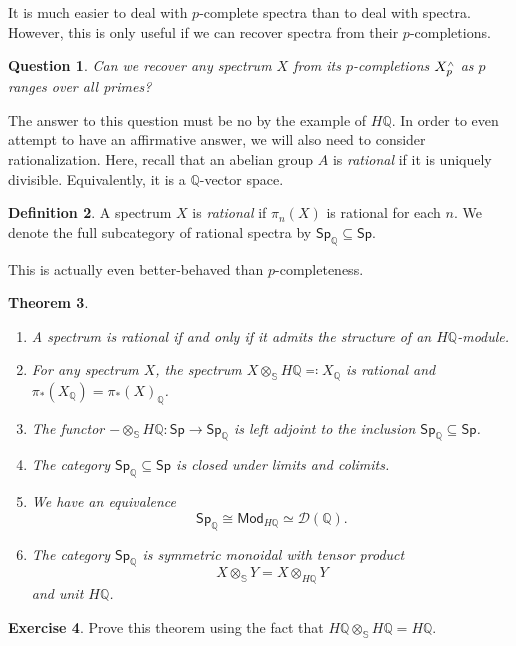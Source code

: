 \documentclass[10pt, oneside]{memoir}
\newtheorem{thm}{Theorem}[subsection]
\newtheorem{quest}[thm]{Question}
\theoremstyle{definition}
\newtheorem{defn}[thm]{Definition}
\newtheorem{exer}[thm]{Exercise}
\theoremstyle{remark}
\theoremstyle{plain}
\theoremstyle{definition}
\theoremstyle{remark}
\newcommand{\Q}{\mathbb{Q}}
\newcommand{\bS}{\mathbb{S}}
\newcommand{\mc}[1]{\mathcal{#1}}
\newcommand{\ms}[1]{\mathsf{#1}}
\newcommand{\1}{\mathbf{1}}
\newcommand{\2}{\mathbf{2}}
\newcommand{\3}{\mathbf{3}}
\newcommand{\sw}{\mathsmaller{\wedge}}
\begin{document}
It is much easier to deal with $p$-complete spectra than to deal with spectra. However, this is only useful if we can recover spectra from their $p$-completions.

\begin{quest}
    Can we recover any spectrum $X$ from its $p$-completions $X_p^{\sw}$ as $p$ ranges over all primes?
\end{quest}

The answer to this question must be no by the example of $H\Q$. In order to even attempt to have an affirmative answer, we will also need to consider rationalization. Here, recall that an abelian group $A$ is \textit{rational} if it is uniquely divisible. Equivalently, it is a $\Q$-vector space.

\begin{defn}
    A spectrum $X$ is \textit{rational} if $\pi_n (X)$ is rational for each $n$. We denote the full subcategory of rational spectra by $\ms{Sp}_{\Q} \subseteq \ms{Sp}$.
\end{defn}

This is actually even better-behaved than $p$-completeness.
\begin{thm}\leavevmode
    \begin{enumerate}
        \item A spectrum is rational if and only if it admits the structure of an $H\Q$-module.
        \item For any spectrum $X$, the spectrum $X \otimes_{\bS} H\Q \eqqcolon X_{\Q}$ is rational and $\pi_*(X_{\Q}) = \pi_*(X)_{\Q}$. 
        \item The functor $-\otimes_{\bS} H\Q \colon \ms{Sp} \to \ms{Sp}_{\Q}$ is left adjoint to the inclusion $\ms{Sp}_{\Q} \subseteq \ms{Sp}$.
        \item The category $\ms{Sp}_{\Q} \subseteq \ms{Sp}$ is closed under limits and colimits.
        \item We have an equivalence
        \[ \ms{Sp}_{\Q} \cong \ms{Mod}_{H\Q} \simeq \mc{D}(\Q). \]
        \item The category $\ms{Sp}_{\Q}$ is symmetric monoidal with tensor product
        \[ X \otimes_{\bS} Y = X \otimes_{H\Q} Y \]
        and unit $H\Q$.
    \end{enumerate}
\end{thm}

\begin{exer}
    Prove this theorem using the fact that $H\Q \otimes_{\bS} H\Q = H\Q$.
\end{exer}
\end{document}
